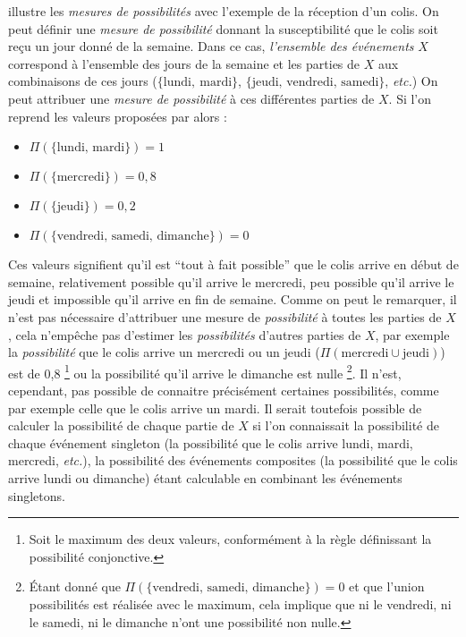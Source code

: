 \textcite{Bouchon-Meunier1995} illustre les \emph{mesures de
  possibilités} avec l'exemple de la réception d'un colis. On peut
définir une \emph{mesure de possibilité} donnant la susceptibilité que
le colis soit reçu un jour donné de la semaine. Dans ce cas,
\emph{l'ensemble des événements} \(X\) correspond à l'ensemble des
jours de la semaine et les parties de \(X\) aux combinaisons de ces
jours (\eg \(\{\text{lundi},\ \text{mardi}\}\),
\(\{\text{jeudi, vendredi, samedi}\}\), \emph{etc.})  On peut
attribuer une \emph{mesure de possibilité} à ces différentes parties
de \(X\). Si l'on reprend les valeurs proposées par
\textcite{Bouchon-Meunier1995} alors :
% 
\begin{itemize}
\item \(\Pi(\{\text{lundi, mardi}\})=1\)
\item \(\Pi(\{\text{mercredi}\})=0,8\)
\item \(\Pi(\{\text{jeudi}\})=0,2\)
\item \(\Pi(\{\text{vendredi, samedi, dimanche}\})=0\)
\end{itemize}
%
Ces valeurs signifient qu'il est \enquote{tout à fait possible} que le
colis arrive en début de semaine, relativement possible qu'il arrive
le mercredi, peu possible qu'il arrive le jeudi et impossible qu'il
arrive en fin de semaine. Comme on peut le remarquer, il n'est pas
nécessaire d'attribuer une mesure de \emph{possibilité} à toutes les
parties de \(X\), cela n'empêche pas d'estimer les \emph{possibilités}
d'autres parties de \(X\), par exemple la \emph{possibilité} que le
colis arrive un mercredi ou un jeudi
(\(\Pi(\text{mercredi} \cup \text{jeudi})\)) est de 0,8 \footnote{Soit
  le maximum des deux valeurs, conformément à la règle définissant la
  possibilité conjonctive.} ou la possibilité qu'il arrive le dimanche
est nulle \footnote{Étant donné que
  \(\Pi(\{\text{vendredi, samedi, dimanche}\})=0\) et que l'union
  possibilités est réalisée avec le maximum, cela implique que ni le
  vendredi, ni le samedi, ni le dimanche n'ont une possibilité non
  nulle.}. Il n'est, cependant, pas possible de connaitre précisément
certaines possibilités, comme par exemple celle que le colis arrive un
mardi. Il serait toutefois possible de calculer la possibilité de
chaque partie de \(X\) si l'on connaissait la possibilité de chaque
événement singleton (\ie la possibilité que le colis arrive lundi,
mardi, mercredi, \emph{etc.}), la possibilité des événements
composites (\eg la possibilité que le colis arrive lundi ou dimanche)
étant calculable en combinant les événements singletons.

